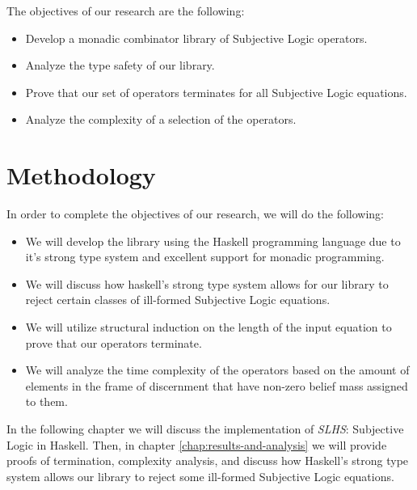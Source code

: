 \documentclass[thesis.tex]{subfiles}
\begin{document}
The objectives of our research are the following:

\begin{itemize}
  \item Develop a monadic combinator library of Subjective Logic operators.
  \item Analyze the type safety of our library.
  \item Prove that our set of operators terminates for all Subjective Logic equations.
  \item Analyze the complexity of a selection of the operators.
\end{itemize}



\section{Methodology}

In order to complete the objectives of our research, we will do the following:

\begin{itemize}
  \item We will develop the library using the Haskell programming language due to it's strong type
system and excellent support for monadic programming.
  \item We will discuss how haskell's strong type system allows for our library to reject certain
classes of ill-formed Subjective Logic equations.
  \item We will utilize structural induction on the length of the input equation to prove that
our operators terminate.
  \item We will analyze the time complexity of the operators based on the amount of elements in the
frame of discernment that have non-zero belief mass assigned to them.
\end{itemize}

In the following chapter we will discuss the implementation of \emph{SLHS}: Subjective Logic in Haskell.
Then, in chapter \ref{chap:results-and-analysis} we will provide proofs of termination, complexity
analysis, and discuss how Haskell's strong type system allows our library to reject some ill-formed
Subjective Logic equations.
\end{document}
